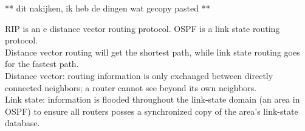 ** dit nakijken, ik heb de dingen wat gecopy pasted **

RIP is an e distance vector routing protocol. OSPF is a link state routing protocol. \\
Distance vector routing will get the shortest path, while link state routing goes for the fastest path. \\

Distance vector: routing information is only exchanged between directly connected neighbors; a router cannot see beyond its own neighbors. \\
Link state: information is flooded throughout the link-state domain (an area in OSPF) to ensure all routers posses a synchronized copy of the area's link-state database.

